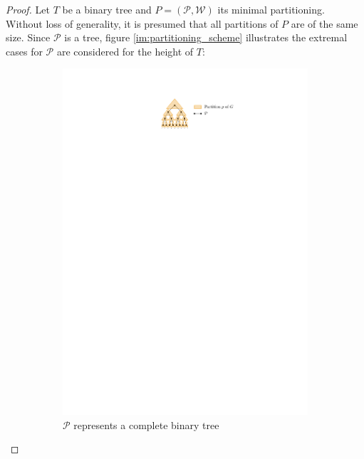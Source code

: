 \begin{proof}
	Let $T$ be a binary tree and $P=(\mathcal{P},\mathcal{W})$ its minimal partitioning. Without loss of generality, it is presumed that all partitions of $P$ are of the same size. Since $\mathcal{P}$ is a tree, figure \ref{im:partitioning_scheme} illustrates the extremal cases for $\mathcal{P}$ are considered for the height of $T$:
	\begin{figure}[H]
		\centering
		\begin{subfigure}{0.6\textwidth}
			\centering
			\includegraphics[page=1,width=\linewidth]{graphics/Partitioning_scheme.pdf}
			\caption{$\mathcal{P}$ represents a complete binary tree}\label{im:partitioning_binary}
		\end{subfigure}
		\begin{subfigure}{0.6\textwidth}
			\centering

\end{subfigure}
\end{figure}
\end{proof}
